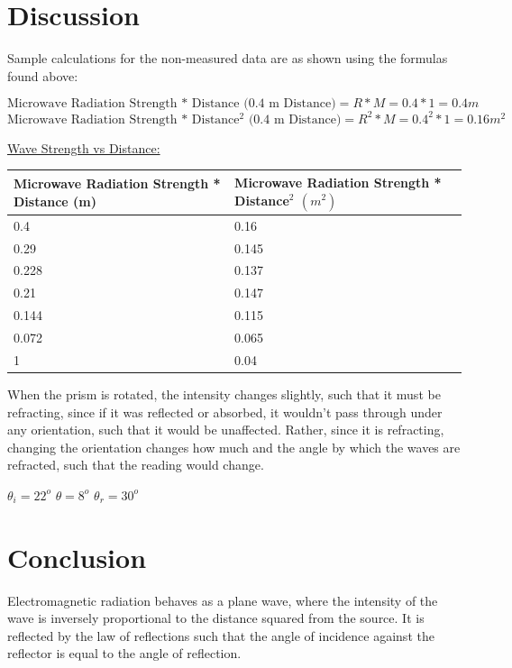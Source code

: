 \documentclass[11pt, titlepage]{article}
\begin{document}
\section*{Discussion}
Sample calculations for the non-measured data are as shown using the formulas found above:

$$\text{Microwave Radiation Strength * Distance (0.4 m Distance)} = R * M = 0.4 * 1 = 0.4 m$$
$$\text{Microwave Radiation Strength * Distance$^2$ (0.4 m Distance)} = R^2 * M = 0.4^2 * 1 = 0.16 m^2$$

\underline{Wave Strength vs Distance:}
\begin{center}
\begin{tabular}
{|m{15em}|m{15em}|}
\hline
Microwave Radiation Strength * Distance (m) & Microwave Radiation Strength * Distance$^2$ $(m^2)$ \\
\hline
0.4 & 0.16\\
\hline
0.29 & 0.145\\
\hline
0.228 & 0.137\\
\hline
0.21 & 0.147\\
\hline
0.144 & 0.115\\
\hline
0.072 & 0.065\\
\hline
1 & 0.04\\
\hline
\end{tabular}
\end{center}

When the prism is rotated, the intensity changes slightly, such that it must be refracting, since if it was reflected or absorbed, it wouldn't pass through under any orientation, such that it would be unaffected. Rather, since it is refracting, changing the orientation changes how much and the angle by which the waves are refracted, such that the reading would change.

$\theta_i = 22^o$
$\theta = 8^o$
$\theta_r = 30^o$



\section*{Conclusion}
Electromagnetic radiation behaves as a plane wave, where the intensity of the wave is inversely proportional to the distance squared from the source. It is reflected by the law of reflections such that the angle of incidence against the reflector is equal to the angle of reflection.
\end{document}
